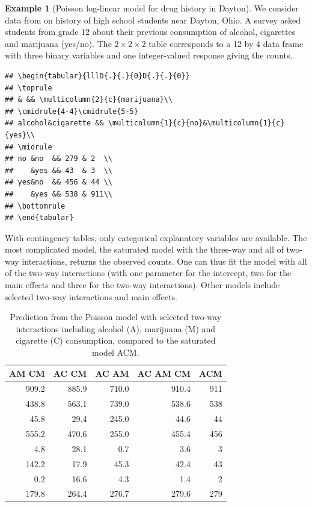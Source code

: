 \documentclass[
  11pt,
  letterpaper,
]{book}
\theoremstyle{definition}
\theoremstyle{definition}
\newtheorem{example}{Example}[chapter]
\theoremstyle{definition}
\theoremstyle{definition}
\theoremstyle{remark}
\begin{document}
\begin{example}[Poisson log-linear model for drug history in Dayton]
\protect\hypertarget{exm:poissonconting}{}\label{exm:poissonconting}We consider data from \citet{Agresti:2019} on history of high school students near Dayton, Ohio. A survey asked students from grade 12 about their previous consumption of alcohol, cigarettes and marijuana (yes/no). The \(2 \times 2 \times 2\) table corresponds to a 12 by 4 data frame with three binary variables and one integer-valued response giving the counts.
\end{example}

\begin{verbatim}
## \begin{tabular}{lllD{.}{.}{0}D{.}{.}{0}}
## \toprule
## & && \multicolumn{2}{c}{marijuana}\\
## \cmidrule{4-4}\cmidrule{5-5}
## alcohol&cigarette && \multicolumn{1}{c}{no}&\multicolumn{1}{c}{yes}\\
## \midrule
## no &no  && 279 & 2  \\
##    &yes && 43  & 3  \\
## yes&no  && 456 & 44 \\
##    &yes && 538 & 911\\
## \bottomrule
## \end{tabular}
\end{verbatim}

With contingency tables, only categorical explanatory variables are available. The most complicated model, the saturated model with the three-way and all of two-way interactions, returns the observed counts. One can thus fit the model with all of the two-way interactions (with one parameter for the intercept, two for the main effects and three for the two-way interactions). Other models include selected two-way interactions and main effects.

\begin{table}

\caption{\label{tab:daytonpred}Prediction from the Poisson model with selected two-way interactions including alcohol (A), marijuana (M) and cigarette (C) consumption, compared to the saturated model ACM.}
\centering
\begin{tabular}[t]{r|r|r|r|r}
\hline
AM CM & AC CM & AC AM & AC AM CM & ACM\\
\hline
909.2 & 885.9 & 710.0 & 910.4 & 911\\
\hline
438.8 & 563.1 & 739.0 & 538.6 & 538\\
\hline
45.8 & 29.4 & 245.0 & 44.6 & 44\\
\hline
555.2 & 470.6 & 255.0 & 455.4 & 456\\
\hline
4.8 & 28.1 & 0.7 & 3.6 & 3\\
\hline
142.2 & 17.9 & 45.3 & 42.4 & 43\\
\hline
0.2 & 16.6 & 4.3 & 1.4 & 2\\
\hline
179.8 & 264.4 & 276.7 & 279.6 & 279\\
\hline
\end{tabular}
\end{table}
\end{document}
